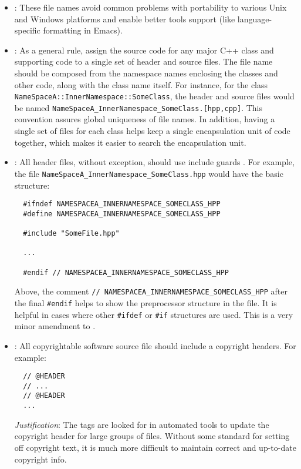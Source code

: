 \begin{itemize}

\item\NOSFFileExtension: These file names avoid common problems with
  portability to various Unix and Windows platforms and enable better
  tools support (like language-specific formatting in Emacs).

\item\NOSFClassFiles: As a general rule, assign the source code for
  any major C++ class and supporting code to a single set of header
  and source files.  The file name should be composed from the
  namespace names enclosing the classes and other code, along with the
  class name itself.  For instance, for the class
  \texttt{NameSpaceA\-::InnerNamespace\-::SomeClass}, the header and
  source files would be named
  \texttt{NameSpaceA\-\_InnerNamespace\-\_SomeClass.[hpp,cpp]}.  This
  convention assures global uniqueness of file names.  In addition,
  having a single set of files for each class helps keep a single
  encapsulation unit of code together, which makes it easier to search
  the encapsulation unit.

\item\NOSFIncludeGuards: All header files, without exception, should
  use include guards {}\cite[Item 24]{C++CodingStandards05}.  For
  example, the file
  {}\texttt{NameSpaceA\-\_InnerNamespace\-\_SomeClass.hpp} would have
  the basic structure:

  {\small\begin{verbatim}
  #ifndef NAMESPACEA_INNERNAMESPACE_SOMECLASS_HPP
  #define NAMESPACEA_INNERNAMESPACE_SOMECLASS_HPP

  #include "SomeFile.hpp"

  ...

  #endif // NAMESPACEA_INNERNAMESPACE_SOMECLASS_HPP
  \end{verbatim}}

  Above, the comment {}\texttt{//
  NAMESPACEA\-\_INNERNAMESPACE\-\_SOMECLASS\-\_HPP} after the final
  \texttt{\#endif} helps to show the preprocessor structure in the
  file.  It is helpful in cases where other \texttt{\#ifdef} or
  \texttt{\#if} structures are used.  This is a very minor amendment
  to \cite[Item 24]{C++CodingStandards05}.

\item\NOSFCopyrightHeaders: All copyrightable software source file should
include a copyright headers.  For example:

  {\small\begin{verbatim}
  // @HEADER
  // ...
  // @HEADER
  ...
  \end{verbatim}}

  \textit{Justification}: The tags {} are looked for in
  automated tools to update the copyright header for large groups of
  files.  Without some standard for setting off copyright text, it is
  much more difficult to maintain correct and up-to-date copyright
  info.

\end{itemize}

